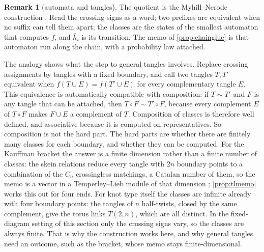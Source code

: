 \documentclass[11pt]{article}
\theoremstyle{definition}\newtheorem{definition}[theorem]{Definition}\newtheorem{remark}[theorem]{Remark}\newtheorem{example}[theorem]{Example}\newtheorem{problem}[theorem]{Open problem}\crefname{problem}{Problem}{Problems}
\begin{document}
\begin{remark}[automata and tangles]\label{rem:nerode}
The quotient is the Myhill--Nerode construction \cite{Nerode1958}. Read the crossing signs as a word; two prefixes are equivalent when no suffix can tell them apart; the classes are the states of the smallest automaton that computes $f$, and $\bar h_i$ is its transition. The memo of \cref{prop:chainglue} is that automaton run along the chain, with a probability law attached.

The analogy shows what the step to general tangles involves. Replace crossing assignments by tangles with a fixed boundary, and call two tangles $T,T'$ equivalent when $f(T\cup E)=f(T'\cup E)$ for every complementary tangle $E$. This equivalence is automatically compatible with composition: if $T\sim T'$ and $F$ is any tangle that can be attached, then $T\circ F\sim T'\circ F$, because every complement $E$ of $T\circ F$ makes $F\cup E$ a complement of $T$. Composition of classes is therefore well defined, and associative because it is computed on representatives. So composition is not the hard part. The hard parts are whether there are finitely many classes for each boundary, and whether they can be computed. For the Kauffman bracket the answer is a finite dimension rather than a finite number of classes: the skein relations reduce every tangle with $2n$ boundary points to a combination of the $C_n$ crossingless matchings, a Catalan number of them, so the memo is a vector in a Temperley--Lieb module of that dimension \cite{Kauffman1987}; \cref{prop:tlmemo} works this out for four ends. For knot type itself the classes are infinite already with four boundary points: the tangles of $n$ half-twists, closed by the same complement, give the torus links $T(2,n)$, which are all distinct. In the fixed-diagram setting of this section only the crossing signs vary, so the classes are always finite. That is why the construction works here, and why general tangles need an outcome, such as the bracket, whose memo stays finite-dimensional.
\end{remark}
\end{document}
